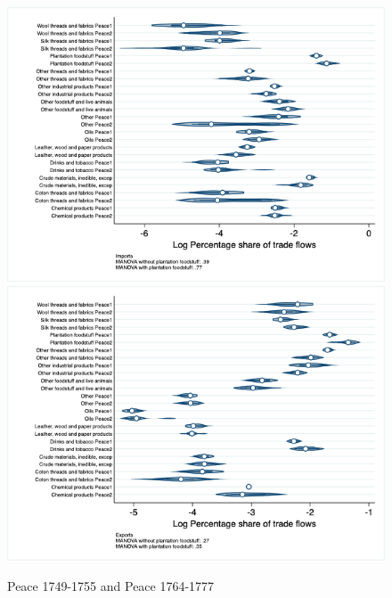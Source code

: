 \documentclass[12pt,a4paper,notitlepage,english]{article}
\begin{document}
\begin{figure}
\centering
\caption{Peace 1749-1755 and Peace 1764-1777}
\label{seven_peace1764_1777_nat_distr_sitc}
\includegraphics[scale=.4]{peace1749_1755_peace1764_1777_nat_distr_Isitc}
\includegraphics[scale=.4]{peace1749_1755_peace1764_1777_nat_distr_Xsitc}
\end{figure}
\end{document}
